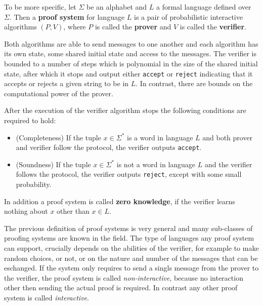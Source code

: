 To be more specific, let $\Sigma$ be an alphabet and $L$ a formal language defined over $\Sigma$. Then a \textbf{proof system} for language $L$ is a pair of probabilistic interactive algorithms $(P,V)$, where $P$ is called the \textbf{prover} and $V$ is called the \textbf{verifier}. 

Both algorithms are able to send messages to one another and each algorithm has its own state, some shared initial state and access to the messages. The verifier is bounded to a number of steps which is polynomial in the size of the shared initial state, after which it stops and output either \texttt{accept} or \texttt{reject} indicating that it accepts or rejects a given string to be in $L$. In contrast, there are bounds on the computational power of the prover.

After the execution of the verifier algorithm stops the following conditions are required to hold:
\begin{itemize}
\item (Completeness) If the tuple $x\in \Sigma^*$ is a word in language $L$ and both prover and verifier follow the protocol, the verifier outputs \texttt{accept}.
\item (Soundness) If the tuple $x\in \Sigma^*$ is not a word in language $L$ and the verifier follows the protocol, the verifier outputs \texttt{reject}, except with some small probability.
\end{itemize}
In addition a proof system is called \textbf{zero knowledge}, if the verifier learns nothing about $x$ other than $x\in L$. 

The previous definition of proof systems is very general and many sub-classes of proofing systems are known in the field. The type of languages any proof system can support, crucially depends on the abilities of the verifier, for example to make random choices, or not, or on the nature and number of the messages that can be eschanged. If the system only requires to send a singls message from the prover to the verifier, the proof system is called \textit{non-interactive}, because no interaction other then sending the actual proof is required. In contrast any other proof system is called \textit{interactive}.

